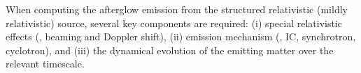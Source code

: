%
%

%
When computing the afterglow emission from the structured relativistic 
(mildly relativistic) source, several key components are required: 
(i) special relativistic effects (\eg, beaming and Doppler shift),
(ii) emission mechanism (\eg, \ac{IC}, synchrotron, cyclotron), 
and (iii) the dynamical evolution of the emitting matter over the 
relevant timescale. 

